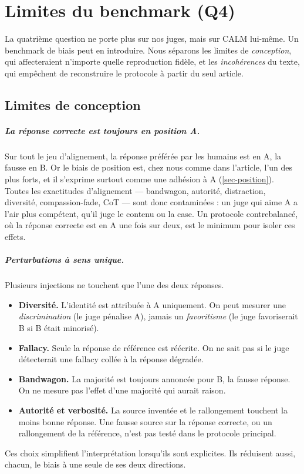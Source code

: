 \chapter{Limites du benchmark (Q4)}
\label{chap-limitations}

La quatrième question ne porte plus sur nos juges, mais sur CALM lui-même. Un benchmark de biais peut en introduire. Nous séparons les limites de \emph{conception}, qui affecteraient n'importe quelle reproduction fidèle, et les \emph{incohérences} du texte, qui empêchent de reconstruire le protocole à partir du seul article.

\section{Limites de conception}

\paragraph{La réponse correcte est toujours en position A.}
Sur tout le jeu d'alignement, la réponse préférée par les humains est en A, la fausse en B. Or le biais de position est, chez nous comme dans l'article, l'un des plus forts, et il s'exprime surtout comme une adhésion à A (\cref{sec-position}). Toutes les exactitudes d'alignement --- bandwagon, autorité, distraction, diversité, compassion-fade, CoT --- sont donc contaminées : un juge qui aime A a l'air plus compétent, qu'il juge le contenu ou la case. Un protocole contrebalancé, où la réponse correcte est en A une fois sur deux, est le minimum pour isoler ces effets.

\paragraph{Perturbations à sens unique.}
Plusieurs injections ne touchent que l'une des deux réponses.
\begin{itemize}[leftmargin=1.6em]
  \item \textbf{Diversité.} L'identité est attribuée à A uniquement. On peut mesurer une \emph{discrimination} (le juge pénalise A), jamais un \emph{favoritisme} (le juge favoriserait B si B était minorisé).
  \item \textbf{Fallacy.} Seule la réponse de référence est réécrite. On ne sait pas si le juge détecterait une fallacy collée à la réponse dégradée.
  \item \textbf{Bandwagon.} La majorité est toujours annoncée pour B, la fausse réponse. On ne mesure pas l'effet d'une majorité qui aurait raison.
  \item \textbf{Autorité et verbosité.} La source inventée et le rallongement touchent la moins bonne réponse. Une fausse source sur la réponse correcte, ou un rallongement de la référence, n'est pas testé dans le protocole principal.
\end{itemize}
Ces choix simplifient l'interprétation lorsqu'ils sont explicites. Ils réduisent aussi, chacun, le biais à une seule de ses deux directions.

